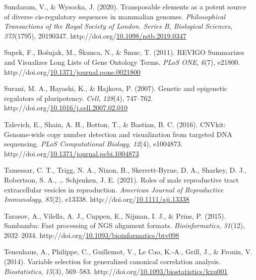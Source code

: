 \documentclass[12pt,twoside]{reedthesis}
\newlength{\cslhangindent}
\newenvironment{CSLReferences}[2] %
 {%
  \setlength{\parindent}{0pt}
  \ifodd #1 \everypar{\setlength{\hangindent}{\cslhangindent}}\ignorespaces\fi
  \ifnum #2 > 0
  \setlength{\parskip}{#2\baselineskip}
  \fi
 }%
 {}
\begin{document}
\begin{CSLReferences}{1}{0}
\leavevmode{}%
Sundaram, V., \& Wysocka, J. (2020). Transposable elements as a potent source of diverse cis-regulatory sequences in mammalian genomes. \emph{Philosophical Transactions of the Royal Society of London. Series B, Biological Sciences}, \emph{375}(1795), 20190347. http://doi.org/\href{https://doi.org/10.1098/rstb.2019.0347}{10.1098/rstb.2019.0347}

\leavevmode{}%
Supek, F., Bošnjak, M., Škunca, N., \& Šmuc, T. (2011). REVIGO Summarizes and Visualizes Long Lists of Gene Ontology Terms. \emph{PLoS ONE}, \emph{6}(7), e21800. http://doi.org/\href{https://doi.org/10.1371/journal.pone.0021800}{10.1371/journal.pone.0021800}

\leavevmode{}%
Surani, M. A., Hayashi, K., \& Hajkova, P. (2007). Genetic and epigenetic regulators of pluripotency. \emph{Cell}, \emph{128}(4), 747--762. http://doi.org/\href{https://doi.org/10.1016/j.cell.2007.02.010}{10.1016/j.cell.2007.02.010}

\leavevmode{}%
Talevich, E., Shain, A. H., Botton, T., \& Bastian, B. C. (2016). CNVkit: Genome-wide copy number detection and visualization from targeted DNA sequencing. \emph{PLoS Computational Biology}, \emph{12}(4), e1004873. http://doi.org/\href{https://doi.org/10.1371/journal.pcbi.1004873}{10.1371/journal.pcbi.1004873}

\leavevmode{}%
Tamessar, C. T., Trigg, N. A., Nixon, B., Skerrett-Byrne, D. A., Sharkey, D. J., Robertson, S. A., \ldots{} Schjenken, J. E. (2021). Roles of male reproductive tract extracellular vesicles in reproduction. \emph{American Journal of Reproductive Immunology}, \emph{85}(2), e13338. http://doi.org/\href{https://doi.org/10.1111/aji.13338}{10.1111/aji.13338}

\leavevmode{}%
Tarasov, A., Vilella, A. J., Cuppen, E., Nijman, I. J., \& Prins, P. (2015). Sambamba: Fast processing of NGS alignment formats. \emph{Bioinformatics}, \emph{31}(12), 2032--2034. http://doi.org/\href{https://doi.org/10.1093/bioinformatics/btv098}{10.1093/bioinformatics/btv098}

\leavevmode{}%
Tenenhaus, A., Philippe, C., Guillemot, V., Le Cao, K.-A., Grill, J., \& Frouin, V. (2014). Variable selection for generalized canonical correlation analysis. \emph{Biostatistics}, \emph{15}(3), 569--583. http://doi.org/\href{https://doi.org/10.1093/biostatistics/kxu001}{10.1093/biostatistics/kxu001}


\end{CSLReferences}
\end{document}
